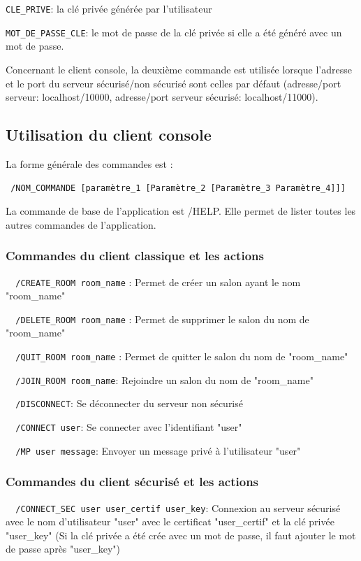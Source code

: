 \documentclass[a4paper,11pt,french]{book}
\begin{document}
\verb+CLE_PRIVE+: la clé privée générée par l'utilisateur

\verb+MOT_DE_PASSE_CLE+: le mot de passe de la clé privée si elle a été généré avec un mot de passe.

	Concernant le client console, la deuxième commande est utilisée lorsque l'adresse et le port du serveur sécurisé/non sécurisé sont celles par défaut (adresse/port serveur: localhost/10000, adresse/port serveur sécurisé: localhost/11000).
	
\subsection{Utilisation du client console}
	
	La forme générale des commandes est : 
	
\verb+ /NOM_COMMANDE [paramètre_1 [Paramètre_2 [Paramètre_3 Paramètre_4]]]+

La commande de base de l'application est /HELP. Elle permet de lister toutes les autres commandes de l'application.
\subsubsection{Commandes du client classique et les actions}

\verb+	/CREATE_ROOM room_name+  : Permet de créer un salon ayant le nom "room\_name"

\verb+	/DELETE_ROOM room_name+ :  Permet de supprimer le salon du nom de "room\_name"

\verb+	/QUIT_ROOM room_name+ :  Permet de quitter le salon du nom de "room\_name"

\verb+	/JOIN_ROOM room_name+:  Rejoindre un salon du nom de "room\_name"

\verb+	/DISCONNECT+: Se déconnecter du serveur non sécurisé

\verb+	/CONNECT user+:  Se connecter avec l'identifiant "user"

\verb+	/MP user message+: Envoyer un message privé à l'utilisateur "user"
			
\subsubsection{Commandes du client sécurisé et les actions}

\verb+	/CONNECT_SEC user user_certif user_key+: Connexion au serveur sécurisé avec le nom d'utilisateur "user" avec le certificat "user\_certif" et la clé privée "user\_key" (Si la clé privée a été crée avec un mot de passe, il faut ajouter le mot de passe après "user\_key")
\end{document}
